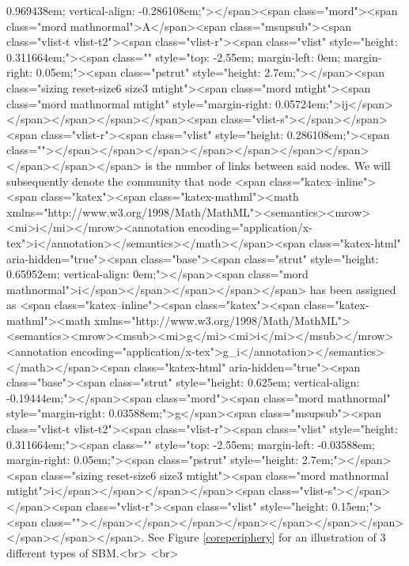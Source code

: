 0.969438em; vertical-align: -0.286108em;"></span><span class="mord"><span class="mord mathnormal">A</span><span class="msupsub"><span class="vlist-t vlist-t2"><span class="vlist-r"><span class="vlist" style="height: 0.311664em;"><span class="" style="top: -2.55em; margin-left: 0em; margin-right: 0.05em;"><span class="pstrut" style="height: 2.7em;"></span><span class="sizing reset-size6 size3 mtight"><span class="mord mtight"><span class="mord mathnormal mtight" style="margin-right: 0.05724em;">ij</span></span></span></span></span><span class="vlist-s">​</span></span><span class="vlist-r"><span class="vlist" style="height: 0.286108em;"><span class=""></span></span></span></span></span></span></span></span></span></span> is the number of links between said nodes. We will subsequently denote the community that node <span class="katex--inline"><span class="katex"><span class="katex-mathml"><math xmlns="http://www.w3.org/1998/Math/MathML"><semantics><mrow><mi>i</mi></mrow><annotation encoding="application/x-tex">i</annotation></semantics></math></span><span class="katex-html" aria-hidden="true"><span class="base"><span class="strut" style="height: 0.65952em; vertical-align: 0em;"></span><span class="mord mathnormal">i</span></span></span></span></span> has been assigned as <span class="katex--inline"><span class="katex"><span class="katex-mathml"><math xmlns="http://www.w3.org/1998/Math/MathML"><semantics><mrow><msub><mi>g</mi><mi>i</mi></msub></mrow><annotation encoding="application/x-tex">g_i</annotation></semantics></math></span><span class="katex-html" aria-hidden="true"><span class="base"><span class="strut" style="height: 0.625em; vertical-align: -0.19444em;"></span><span class="mord"><span class="mord mathnormal" style="margin-right: 0.03588em;">g</span><span class="msupsub"><span class="vlist-t vlist-t2"><span class="vlist-r"><span class="vlist" style="height: 0.311664em;"><span class="" style="top: -2.55em; margin-left: -0.03588em; margin-right: 0.05em;"><span class="pstrut" style="height: 2.7em;"></span><span class="sizing reset-size6 size3 mtight"><span class="mord mathnormal mtight">i</span></span></span></span><span class="vlist-s">​</span></span><span class="vlist-r"><span class="vlist" style="height: 0.15em;"><span class=""></span></span></span></span></span></span></span></span></span></span>. See Figure \ref{coreperiphery} for an illustration of 3 different types of SBM.<br>
\newline<br>
